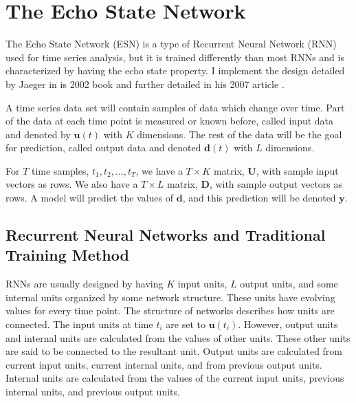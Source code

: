 \documentclass{article}
\begin{document}
\section{The Echo State Network}

\newcommand{\Tv}{\mathbf{T}}
\newcommand{\Uv}{\mathbf{U}}
\newcommand{\Dv}{\mathbf{D}}
\newcommand{\tv}{\mathbf{t}}
\newcommand{\uv}{\mathbf{u}}
\newcommand{\dv}{\mathbf{d}}
\newcommand{\yv}{\mathbf{y}}
\newcommand{\Fv}{\mathbf{F}}
\newcommand{\wv}{\mathbf{w}}

The Echo State Network (ESN) is a type of Recurrent Neural Network (RNN) used
for time series analysis, but it is trained differently than most RNNs and is
characterized by having the echo state property. I implement the design
detailed by Jaeger in is 2002 book \cite{jaeger2002tutorial} and further
detailed in his 2007 article \cite{jaeger2007echo}.

A time series data set will contain samples of data which change over time.
Part of the data at each time point is measured or known before, called input
data and denoted by $\uv(t)$ with $K$ dimensions. The rest of the data will
be the goal for prediction, called output data and denoted $\dv(t)$ with $L$
dimensions.

For $T$ time samples, $t_1, t_2, \dots, t_T$, we have a $T \times K$ matrix,
$\Uv$, with sample input vectors as rows. We also have a $T \times L$ matrix,
$\Dv$, with sample output vectors as rows. A model will predict the values of
$\dv$, and this prediction will be denoted $\yv$.

\subsection{Recurrent Neural Networks and Traditional Training Method}
\label{sec:rnn}

RNNs are usually designed by having $K$ input units, $L$ output units, and
some internal units organized by some network structure. These units have
evolving values for every time point. The structure of networks describes how
units are connected. The input units at time $t_i$ are set to $\uv(t_i)$.
However, output units and internal units are calculated from the values of
other units. These other units are said to be connected to the resultant
unit. Output units are calculated from current input units, current internal
units, and from previous output units. Internal units are calculated from the
values of the current input units, previous internal units, and previous
output units.
\end{document}
